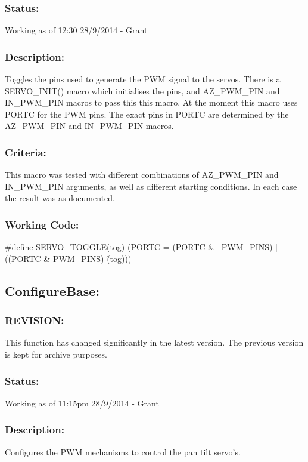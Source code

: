 \documentclass[]{report}
\begin{document}
\subsubsection{Status:}
Working as of 12:30 28/9/2014 - Grant

\subsubsection{Description:}
Toggles the pins used to generate the PWM signal to the servos. There is a SERVO\_INIT() macro which initialises the pins, and AZ\_PWM\_PIN and IN\_PWM\_PIN macros to pass this this macro. At the moment this macro uses PORTC for the PWM pins. The exact pins in PORTC are determined by the AZ\_PWM\_PIN and IN\_PWM\_PIN macros.

\subsubsection{Criteria:}
This macro was tested with different combinations of AZ\_PWM\_PIN and IN\_PWM\_PIN arguments, as well as different starting conditions. In each case the result was as documented.

\subsubsection{Working Code:}
\#define SERVO\_TOGGLE(tog) (PORTC = (PORTC \& ~PWM\_PINS) | ((PORTC \& PWM\_PINS) \^ (tog)))

\subsection{ConfigureBase:}
\subsubsection{REVISION:}
This function has changed significantly in the latest version. The previous version is kept for archive purposes.

\subsubsection{Status:}
Working as of 11:15pm 28/9/2014 - Grant

\subsubsection{Description:}
Configures the PWM mechanisms to control the pan tilt servo's.
\end{document}
